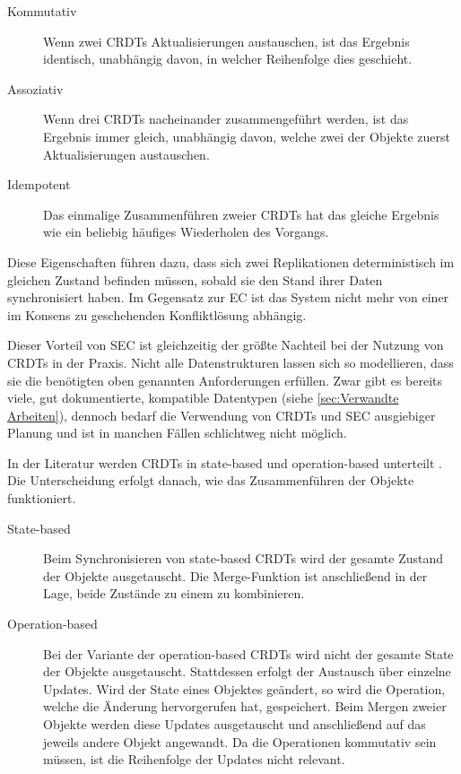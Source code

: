 \documentclass[a4paper, 12pt]{scrreprt}
\begin{document}
\begin{description}
	\item[Kommutativ] Wenn zwei CRDTs Aktualisierungen austauschen, ist das Ergebnis identisch, unabhängig davon, in welcher Reihenfolge dies geschieht.%
	\item[Assoziativ] Wenn drei CRDTs nacheinander zusammengeführt werden, ist das Ergebnis immer gleich, unabhängig davon, welche zwei der Objekte zuerst Aktualisierungen austauschen.%
	\item[Idempotent] Das einmalige Zusammenführen zweier CRDTs hat das gleiche Ergebnis wie ein beliebig häufiges Wiederholen des Vorgangs.%
\end{description}

Diese Eigenschaften führen dazu, dass sich zwei Replikationen deterministisch im gleichen Zustand befinden müssen, sobald sie den Stand ihrer Daten synchronisiert haben. Im Gegensatz zur \ac{EC} ist das System nicht mehr von einer im Konsens zu geschehenden Konfliktlösung abhängig. 

Dieser Vorteil von \ac{SEC} ist gleichzeitig der größte Nachteil bei der Nutzung von CRDTs in der Praxis. Nicht alle Datenstrukturen lassen sich so modellieren, dass sie die benötigten oben genannten Anforderungen erfüllen. Zwar gibt es bereits viele, gut dokumentierte, kompatible Datentypen (siehe \ref{sec:Verwandte Arbeiten}), dennoch bedarf die Verwendung von CRDTs und \ac{SEC} ausgiebiger Planung und ist in manchen Fällen schlichtweg nicht möglich.

In der Literatur werden CRDTs in state-based und operation-based unterteilt \autocite[S. 10]{ArticleOptimisticReplication}. Die Unterscheidung erfolgt danach, wie das Zusammenführen der Objekte funktioniert.

\begin{description}
	\item[State-based]
	Beim Synchronisieren von state-based CRDTs wird der gesamte Zustand der Objekte ausgetauscht.
	Die Merge-Funktion ist anschließend in der Lage, beide Zustände zu einem zu kombinieren. 
	
	\item[Operation-based]
	Bei der Variante der operation-based CRDTs wird nicht der gesamte State der Objekte ausgetauscht. Stattdessen erfolgt der Austausch über einzelne Updates. Wird der State eines Objektes geändert, so wird die Operation, welche die Änderung hervorgerufen hat, gespeichert. Beim Mergen zweier Objekte werden diese Updates ausgetauscht und anschließend auf das jeweils andere Objekt angewandt. Da die Operationen kommutativ sein müssen,
	ist die Reihenfolge der Updates nicht relevant. 
\end{description} 
\end{document}

